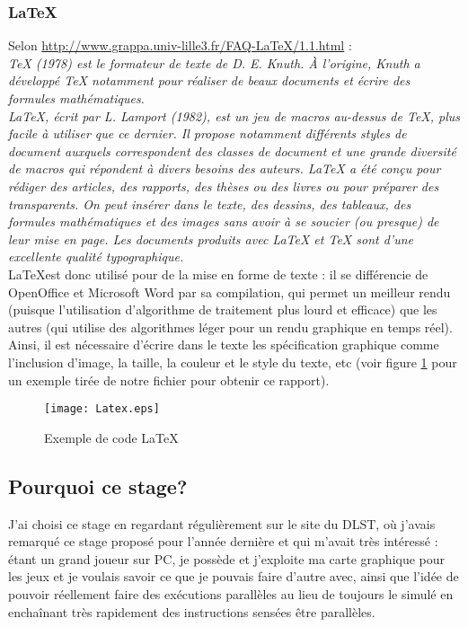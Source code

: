 \documentclass[a4paper,12pt]{article}
\begin{document}
{{	\subsubsection{\LaTeX}
	\indent Selon \url{http://www.grappa.univ-lille3.fr/FAQ-LaTeX/1.1.html} :\\ \textit{TeX (1978) est le formateur de texte de D. E. Knuth. \`A l'origine, Knuth a développé TeX notamment pour réaliser de beaux documents et \'e{}crire des formules mathématiques.\\
    LaTeX, écrit par L. Lamport (1982), est un jeu de macros au-dessus de TeX, plus facile à utiliser que ce dernier. Il
propose notamment différents styles de document auxquels
correspondent des classes de document et une grande diversité
de macros qui répondent à divers besoins des auteurs. LaTeX a
été conçu pour rédiger des articles, des rapports, des thèses ou
des livres ou pour préparer des transparents. On peut insérer
dans le texte, des dessins, des tableaux, des formules
mathématiques et des images sans avoir à se soucier (ou presque)
de leur mise en page. Les documents produits avec LaTeX et TeX
sont d'une excellente qualité typographique.} \\
\indent \LaTeX est donc utilis\'e pour de la mise en forme de texte : il se diff\'erencie de OpenOffice et Microsoft Word par sa compilation, qui permet un meilleur rendu (puisque l'utilisation d'algorithme de traitement plus lourd et efficace) que les autres (qui utilise des algorithmes l\'e{}ger pour un rendu graphique en temps r\'e{}el). Ainsi, il est n\'e{}cessaire d'\'e{}crire dans le texte les sp\'e{}cification graphique comme l'inclusion d'image, la taille, la couleur et le style du texte, etc (voir figure \ref{fig:Latex} pour un exemple tir\'e{}e de notre fichier pour obtenir ce rapport).~
	\begin{figure}[!ht]
	    \centering
	    \caption{Exemple de code \LaTeX}
	    \label{fig:Latex}
	    \texttt{[image: Latex.eps]}
	\end{figure}
	\subsection{Pourquoi ce stage?}
	\indent J'ai choisi ce stage en regardant r\'e{}gulièrement sur le site du DLST, o\`u j'avais remarqu\'e ce stage propos\'e pour l'ann\'e{}e derni\`ere et qui m'avait tr\`es int\'e{}ress\'e : \'e{}tant un grand joueur sur PC, je poss\`ede et j'exploite ma carte graphique pour les jeux et je voulais savoir ce que je pouvais faire d'autre avec, ainsi que l'id\'e{}e de pouvoir r\'e{}ellement faire des ex\'e{}cutions parall\`eles au lieu de toujours le simul\'e en encha\^inant tr\`es rapidement des instructions sens\'e{}es \^etre parall\`eles.
	\newpage
}}
\end{document}
